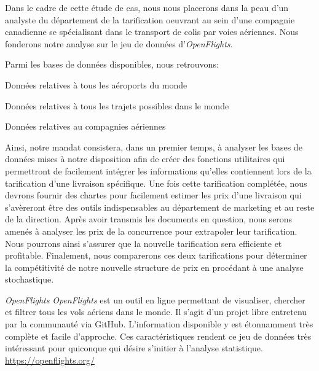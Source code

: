 Dans le cadre de cette étude de cas, nous nous placerons dans la peau d'un analyste du département de la tarification oeuvrant au sein d'une compagnie canadienne se spécialisant dans le transport de colis par voies aériennes. Nous fonderons notre analyse sur le jeu de données d'\emph{OpenFlights}. \cite{OpenFlightsData} 


Parmi les bases de données disponibles, nous retrouvons: \\

\begin{description}[style=multiline,leftmargin=2.5cm]
	\item[airports.dat] Données relatives à tous les aéroports du monde \cite{Data:RouteWorldwide}
	\item[routes.dat] Données relatives à tous les trajets possibles dans le monde \cite{Data:AirportWorldwide}
	\item[airlines.dat] Données relatives au compagnies aériennes \cite{Data:AirlineWorldWide}
\end{description}

\vspace{\baselineskip}
Ainsi, notre mandat consistera, dans un premier temps, à analyser les bases de données mises à notre disposition afin de créer des fonctions utilitaires qui permettront de facilement intégrer les informations qu'elles contiennent lors de la tarification d'une livraison spécifique. Une fois cette tarification complétée, nous devrons fournir des chartes pour facilement estimer les prix d'une livraison qui s'avèreront être des outils indispensables au département de marketing et au reste de la direction. Après avoir transmis les documents en question, nous serons amenés à analyser les prix de la concurrence pour extrapoler leur tarification. Nous pourrons ainsi s'assurer que la nouvelle tarification sera efficiente et profitable. Finalement, nous comparerons ces deux tarifications pour déterminer la compétitivité de notre nouvelle structure de prix en procédant à une analyse stochastique. \\

\begin{moreInfo}{\emph{OpenFlights}}
	\emph{OpenFlights} est un outil en ligne permettant de visualiser, chercher et filtrer tous les vols aériens dans le monde. Il s’agit d’un projet libre entretenu par la communauté via GitHub. \cite{GitHub} L’information disponible y est étonnamment très complète et facile d’approche. Ces caractéristiques rendent ce jeu de données très intéressant pour quiconque qui désire s’initier à l’analyse statistique. \\
	\url{https://openflights.org/}
\end{moreInfo}

